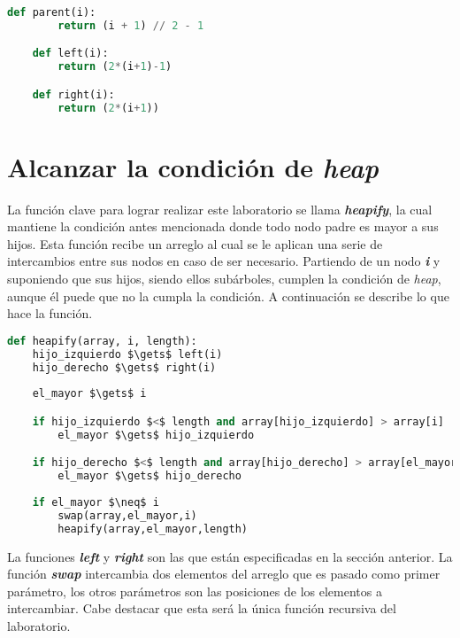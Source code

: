 \documentclass[11pt,letterpaper]{article}
\begin{document}
\vspace{1em}

\begin{center}
\begin{lstlisting}[language=Python,frame=single]
    def parent(i):
        return (i + 1) // 2 - 1

    def left(i):
        return (2*(i+1)-1)

    def right(i):
        return (2*(i+1))
\end{lstlisting}
\end{center}


\section*{Alcanzar la condición de \textit{heap}}

La función clave para lograr realizar este laboratorio se llama \textbf{\textit{heapify}}, la cual mantiene la condición antes mencionada donde todo nodo padre es mayor a sus hijos. Esta función recibe un arreglo al cual se le aplican una serie de intercambios entre sus nodos en caso de ser necesario. Partiendo de un nodo \textbf{\textit{i}} y suponiendo que sus hijos, siendo ellos subárboles, cumplen la condición de \textit{heap}, aunque él puede que no la cumpla la condición. A continuación se describe lo que hace la función.

\vspace{1em}

\begin{center}
\begin{lstlisting}[language=Python,frame=single,mathescape]
def heapify(array, i, length):
    hijo_izquierdo $\gets$ left(i)
    hijo_derecho $\gets$ right(i)
    
    el_mayor $\gets$ i

    if hijo_izquierdo $<$ length and array[hijo_izquierdo] > array[i]
        el_mayor $\gets$ hijo_izquierdo

    if hijo_derecho $<$ length and array[hijo_derecho] > array[el_mayor]
        el_mayor $\gets$ hijo_derecho
        
    if el_mayor $\neq$ i
        swap(array,el_mayor,i)
        heapify(array,el_mayor,length)
\end{lstlisting}
\end{center}

La funciones \textbf{\textit{left}} y \textbf{\textit{right}} son las que están especificadas en la sección anterior. La función \textbf{\textit{swap}} intercambia dos elementos del arreglo que es pasado como primer parámetro, los otros parámetros son las posiciones de los elementos a intercambiar. Cabe destacar que esta será la única función recursiva del laboratorio.
\end{document}
